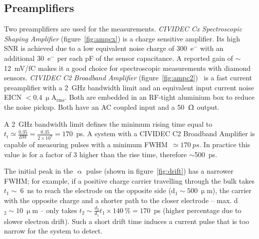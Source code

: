 \subsection{Preamplifiers}
\label{sec:preamps}
Two preamplifiers are used for the measurements. \emph{CIVIDEC Cx Spectroscopic Shaping Amplifier} (figure~\ref{fig:ampcx}) is a charge sensitive amplifier. Its high SNR is achieved due to a low equivalent noise charge of 300~e$^-$ with an additional 30~e$^-$ per each pF of the sensor capacitance. A reported gain of $\sim$12~mV/fC makes it a good choice for spectroscopic measurements with diamond sensors. \emph{CIVIDEC C2 Broadband Amplifier} (figure~\ref{fig:ampc2})~\cite{1369574} is a fast current preamplifier with a 2~GHz bandwidth limit and an equivalent input current noise EICN $< 0.4~\upmu$A$_\mathrm{rms}$. %
Both are embedded in an RF-tight aluminium box to reduce the noise pickup. Both have an AC coupled input and a  50~$\Upomega$ output.

A 2~GHz bandwidth limit defines the minimum rising time equal to $t_{\mathrm{r}}\simeq\frac{0.35}{BW}=\frac{0.35}{2\times10^9}=170$~ps. A system with a CIVIDEC C2 Broadband Amplifier is capable of measuring pulses with a minimum FWHM~$\simeq170~ps$. In practice this value is for a factor of 3 higher than the rise time, therefore $\sim$500~ps. 

The initial peak in the $\upalpha$ pulse (shown in figure~\ref{fig:drift}) has a narrower FWHM; for example, if a positive charge carrier travelling through the bulk takes $t_{\mathrm{1}}\sim~$6~ns to reach the electrode on the opposite side (d$_\mathrm{1}\sim500~\upmu$m), the carrier with the opposite charge and a shorter path to the closer electrode -- max. d$_2\sim10~\upmu$m -- only takes $t_{\mathrm{2}}\sim \frac{d_\mathrm{2}}{d_\mathrm{1}}t_\mathrm{1}\times140~\%=170$~ps (higher percentage due to slower electron drift). Such a short drift time induces a current pulse that is too narrow for the system to detect.


